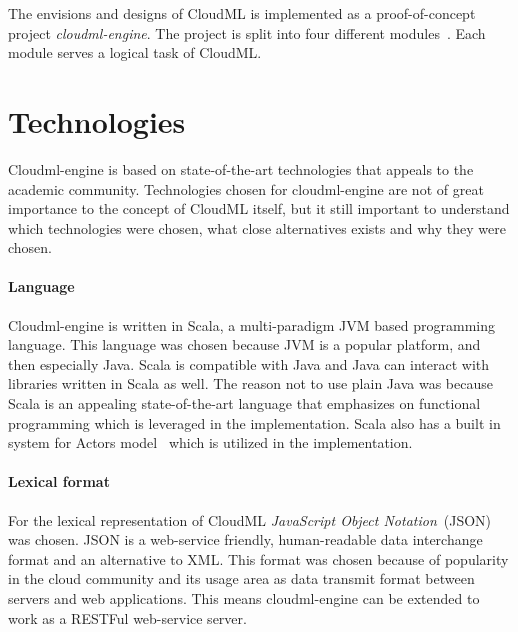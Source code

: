 



The envisions and designs of CloudML is implemented as a proof-of-concept project \emph{cloudml-engine}.
The project is split into four different modules~. 
Each module serves a logical task of CloudML.

\section{Technologies}

Cloudml-engine is based on state-of-the-art technologies that appeals to the academic community.
Technologies chosen for cloudml-engine are not of great importance to the concept of CloudML itself,
but it still important to understand which technologies were chosen, what close alternatives exists
and why they were chosen.

\paragraph{Language} 
Cloudml-engine is written in Scala, a multi-paradigm JVM based programming language.
This language was chosen because JVM is a popular platform, and then especially Java.
Scala is compatible with Java and Java can interact with libraries written in Scala as well.
The reason not to use plain Java was because Scala is an appealing state-of-the-art language that emphasizes 
on functional programming which is leveraged in the implementation.
Scala also has a built in system for Actors model~\cite{actors:haller07} which is utilized in the implementation.

\paragraph{Lexical format}
For the lexical representation of CloudML \emph{JavaScript Object Notation}~(JSON) was chosen.
JSON is a web-service friendly, human-readable data interchange format and an alternative to XML.
This format was chosen because of popularity in the cloud community 
and its usage area as data transmit format between servers and web applications.
This means cloudml-engine can be extended to work as a RESTFul web-service server.

